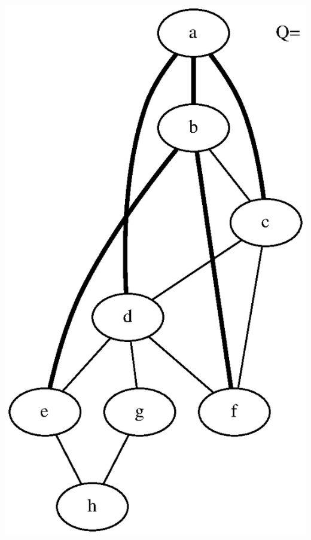 \documentclass{article}
\begin{document}
\includegraphics[height=.3\textheight]{bfs_undirected_classroom_03.eps}
\vspace{1em}
\end{document}
